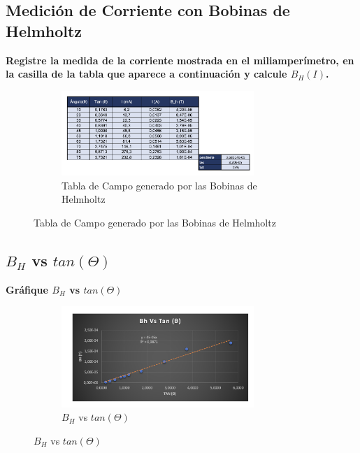 \subsection{Medición de Corriente con Bobinas de Helmholtz}
\textbf{Registre la medida de la corriente
mostrada en el miliamperímetro, en la casilla de la tabla que aparece a continuación
y calcule $B_H(I)$.}
\begin{figure}[H]
    \centering
    \begin{subfigure}[b]{\textwidth}
        \centering
        \includegraphics[width=0.8\textwidth]{Figures/1. Content/TablaBHI.png}
        \caption{Tabla de Campo generado por las Bobinas de Helmholtz}
        \label{fig: Tabla de Campo generado por las Bobinas de Helmholtz}
    \end{subfigure}
    \hfill
\end{figure}

\subsection{$B_H$ vs $tan(\Theta)$}
\textbf{Gráfique $B_H$ vs $tan(\Theta)$}

\begin{figure}[H]
  \centering
  \begin{subfigure}[b]{\textwidth}
      \centering
      \includegraphics[width=0.8\textwidth]{Figures/1. Content/BHvsTheta.png}
      \caption{$B_H$ vs $tan(\Theta)$}
      \label{fig: B_H vs tanTheta}
  \end{subfigure}
  \hfill
\end{figure}

